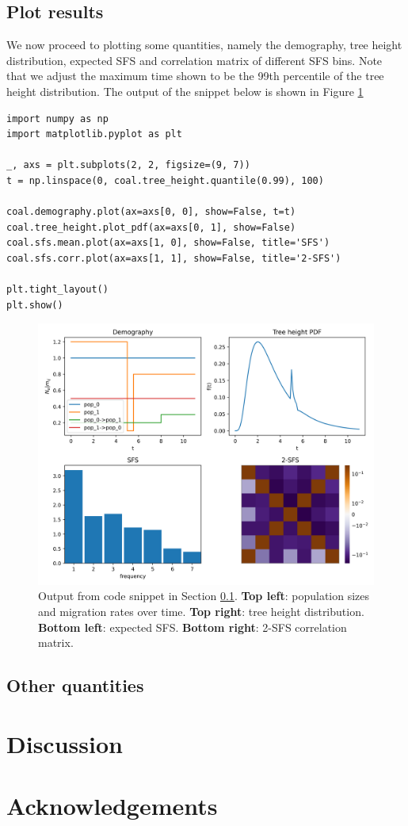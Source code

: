 \documentclass[hidelinks,11pt]{article}
\begin{document}
\subsection{Plot results}\label{subsec:plotting}
We now proceed to plotting some quantities, namely the demography, tree height distribution, expected SFS and correlation matrix of different SFS bins. Note that we adjust the maximum time shown to be the 99th percentile of the tree height distribution. The output of the snippet below is shown in Figure \ref{fig:simple-example}
\begin{verbatim}
import numpy as np
import matplotlib.pyplot as plt

_, axs = plt.subplots(2, 2, figsize=(9, 7))
t = np.linspace(0, coal.tree_height.quantile(0.99), 100)

coal.demography.plot(ax=axs[0, 0], show=False, t=t)
coal.tree_height.plot_pdf(ax=axs[0, 1], show=False)
coal.sfs.mean.plot(ax=axs[1, 0], show=False, title='SFS')
coal.sfs.corr.plot(ax=axs[1, 1], show=False, title='2-SFS')

plt.tight_layout()
plt.show()
\end{verbatim}

\begin{figure}[H]
    \centering
    \includegraphics[width=\textwidth]{figures/manuscript_example.png}
    \caption{Output from code snippet in Section \ref{subsec:plotting}. \textbf{Top left}: population sizes and migration rates over time. \textbf{Top right}: tree height distribution. \textbf{Bottom left}: expected SFS. \textbf{Bottom right}: 2-SFS correlation matrix.}
    \label{fig:simple-example}
\end{figure}

\subsection{Other quantities}

\section{Discussion}

\section*{Acknowledgements}

\newpage


\newpage
\appendix

\end{document}
